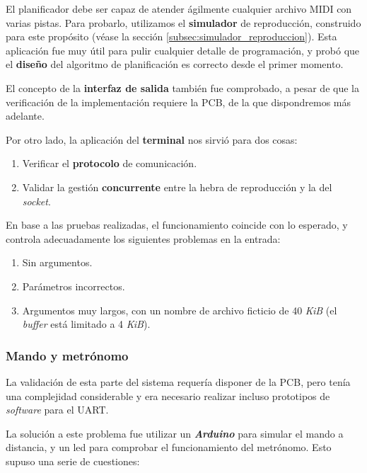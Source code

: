 El planificador debe ser capaz de atender ágilmente cualquier archivo \acrshort{MIDI} con varias pistas. Para probarlo, utilizamos el \textbf{simulador} de reproducción, construido para este propósito (véase la sección \ref{subsec:simulador_reproduccion}). Esta aplicación fue muy útil para pulir cualquier detalle de programación, y probó que el \textbf{diseño} del algoritmo de planificación es correcto desde el primer momento.

El concepto de la \textbf{interfaz de salida} también fue comprobado, a pesar de que la verificación de la implementación requiere la \acrshort{PCB}, de la que dispondremos más adelante.

Por otro lado, la aplicación del \textbf{terminal} nos sirvió para dos cosas:

\begin{enumerate}
	\item Verificar el \textbf{protocolo} de comunicación.
	\item Validar la gestión \textbf{concurrente} entre la hebra de reproducción y la del \textit{socket}.
\end{enumerate}

En base a las pruebas realizadas, el funcionamiento coincide con lo esperado, y controla adecuadamente los siguientes problemas en la entrada:

\begin{enumerate}
	\item Sin argumentos.
	\item Parámetros incorrectos.
	\item Argumentos muy largos, con un nombre de archivo ficticio de 40 \textit{KiB} (el \textit{buffer} está limitado a 4 \textit{KiB}).
\end{enumerate}

\subsubsection{Mando y metrónomo}

La validación de esta parte del sistema requería disponer de la \acrshort{PCB}, pero tenía una complejidad considerable y era necesario realizar incluso prototipos de \textit{software} para el \acrshort{UART}.

La solución a este problema fue utilizar un \textbf{\textit{Arduino}} para simular el mando a distancia, y un \acrshort{led} para comprobar el funcionamiento del metrónomo. Esto supuso una serie de cuestiones:

